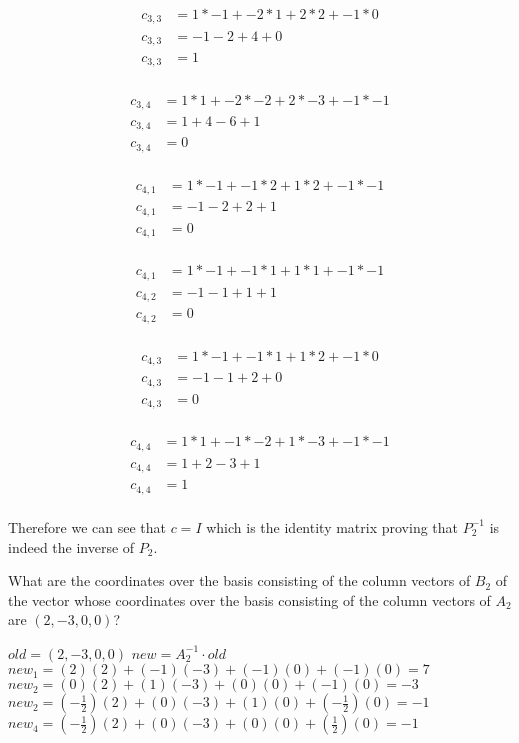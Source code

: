 \documentclass[12pt]{article}
\begin{document}
\begin{itemize}
\begin{align*}
    c_{3,3} &= 1 * -1 + -2 * 1 + 2 * 2 + -1 * 0 \\
    c_{3,3} &= -1 - 2 + 4 + 0 \\
    c_{3,3} &= 1  \\
\end{align*}

\begin{align*}
    c_{3,4} &= 1 * 1 + -2 * -2 + 2 * -3 + -1 * -1 \\
    c_{3,4} &= 1 + 4 - 6 + 1 \\
    c_{3,4} &= 0  \\
\end{align*}

\begin{align*}
    c_{4,1} &= 1 * -1 + -1 * 2 + 1 * 2 + -1 * -1 \\
    c_{4,1} &= -1 - 2 + 2 + 1 \\
    c_{4,1} &= 0  \\
\end{align*}

\begin{align*}
    c_{4,1} &= 1 * -1 + -1 * 1 + 1 * 1 + -1 * -1 \\
    c_{4,2} &= -1 - 1 + 1 + 1 \\
    c_{4,2} &= 0  \\
\end{align*}

\begin{align*}
    c_{4,3} &= 1 * -1 + -1 * 1 + 1 * 2 + -1 * 0 \\
    c_{4,3} &= -1 - 1 + 2 + 0 \\
    c_{4,3} &= 0  \\
\end{align*}

\begin{align*}
    c_{4,4} &= 1 * 1 + -1 * -2 + 1 * -3 + -1 * -1 \\
    c_{4,4} &= 1 + 2 - 3 + 1 \\
    c_{4,4} &= 1  \\
\end{align*}

Therefore we can see that $c=I$ which is the identity matrix proving that $P_2^{-1}$ is indeed the inverse of $P_2$. \\
\newline 

What are the coordinates over the basis consisting of the
column vectors of $B_2$ of the vector whose coordinates over the
basis  consisting of the column vectors of $A_2$ are
$(2, -3, 0, 0)$?
\end{itemize}
$old=(2,-3,0,0)$
\newline $new=A_2^{-1}\cdot old$
\newline $new_1=(2)(2)+(-1)(-3)+(-1)(0)+(-1)(0)=7$
\newline $new_2=(0)(2)+(1)(-3)+(0)(0)+(-1)(0)=-3$
\newline $new_2=(-\frac{1}{2})(2)+(0)(-3)+(1)(0)+(-\frac{1}{2})(0)=-1$
\newline $new_4=(-\frac{1}{2})(2)+(0)(-3)+(0)(0)+(\frac{1}{2})(0)=-1$
\end{document}
